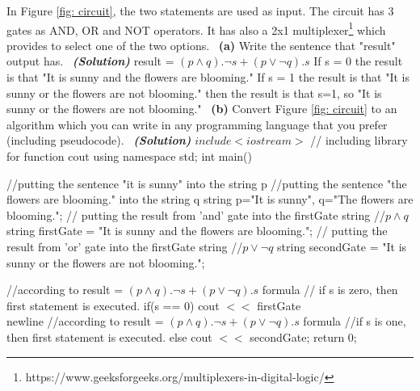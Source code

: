\documentclass[a4 paper]{article}
\numberwithin{equation}{section}
\newcommand{\subproblem}[1]{~\newline\textbf{(#1)}}
\newcommand{\solution}{~\newline\textbf{\textit{(Solution)}} }
\newcommand{\0}{\mathbf{0}}
\begin{document}
In Figure \ref{fig: circuit}, the two statements are used as input. The circuit has 3 gates as AND, OR and NOT operators. It has also a 2x1 multiplexer\footnote{https://www.geeksforgeeks.org/multiplexers-in-digital-logic/} which provides to select one of the two options. 
\subproblem{a} Write the sentence that "result" output has.
\solution
\newline
\newline
result = $(p\wedge q).\neg s + (p\vee \neg q).s$
\newline
If s = 0 the result is that "It is sunny and the flowers are blooming."
\newline
If s = 1 the result is that "It is sunny or the flowers are not blooming."
\newline
then the result is that s=1, so "It is sunny or the flowers are not blooming."
\newline
\subproblem{b} Convert Figure \ref{fig: circuit} to an algorithm which you can write in any programming language that you prefer (including pseudocode).
\solution
\newline
\newline
$include <iostream>$ // including library for function cout
\newline
using namespace std;
\newline
int main(){
\newline
//putting the sentence "it is sunny" into the string p\newline
//putting the sentence "the flowers are blooming." into the string q\newline
string p="It is sunny", q="The flowers are blooming.";\newline\newline
// putting the result from 'and' gate into the firstGate string\newline
//$p\wedge q$
\newline
string firstGate = "It is sunny and the flowers are blooming.";
\newline
// putting the result from 'or' gate into the firstGate string
\newline
//$p\vee \neg q$
\newline
string secondGate = "It is sunny or the flowers are not blooming.";
\newline

//according to result = $(p\wedge q).\neg s + (p\vee \neg q).s$ formula
\newline
// if s is zero, then first statement is executed.
\newline
    if(s == 0)
\newline\newline
        cout $<<$ firstGate
\\newline
//according to result = $(p\wedge q).\neg s + (p\vee \neg q).s$ formula
\newline
//if s is one, then first statement is executed.
\newline
    else
\newline
        cout $<<$ secondGate;
\newline
return 0;
}\newline
\end{document}
